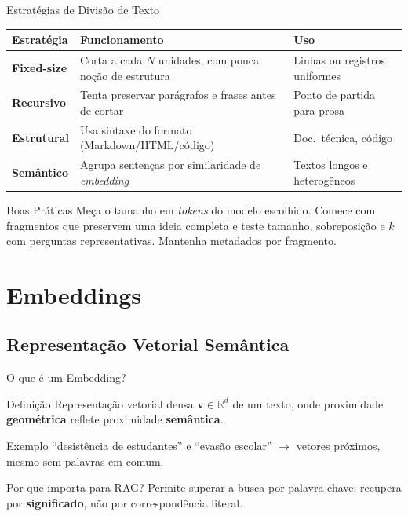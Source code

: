 \documentclass[aspectratio=169]{beamer}
\begin{document}
\begin{frame}[shrink=5]{Estratégias de Divisão de Texto}
    \begin{center}\footnotesize
    \begin{tabular}{>{\bfseries}p{2.6cm}p{5.8cm}p{2.6cm}}
    \toprule
    Estratégia & Funcionamento & Uso \\
    \midrule
    Fixed-size & Corta a cada $N$ unidades, com pouca noção de estrutura & Linhas ou registros uniformes \\
    Recursivo & Tenta preservar parágrafos e frases antes de cortar & Ponto de partida para prosa \\
    Estrutural & Usa sintaxe do formato (Markdown/HTML/código) & Doc.\ técnica, código \\
    Semântico & Agrupa sentenças por similaridade de \textit{embedding} & Textos longos e heterogêneos \\
    \bottomrule
    \end{tabular}
    \end{center}
    \pause
    \begin{alertblock}{Boas Práticas}
        \footnotesize Meça o tamanho em \textit{tokens} do modelo escolhido. Comece com fragmentos que preservem uma ideia completa e teste tamanho, sobreposição e $k$ com perguntas representativas. Mantenha metadados por fragmento.
    \end{alertblock}
\end{frame}

\section{Embeddings}

\subsection{Representação Vetorial Semântica}

\begin{frame}{O que é um Embedding?}
    \begin{block}{Definição}
        \footnotesize Representação vetorial densa $\mathbf{v} \in \mathbb{R}^d$ de um texto, onde proximidade \textbf{geométrica} reflete proximidade \textbf{semântica}.
    \end{block}
    \pause
    \begin{exampleblock}{Exemplo}
        \footnotesize ``desistência de estudantes'' e ``evasão escolar'' $\to$ vetores próximos, mesmo sem palavras em comum.
    \end{exampleblock}
    \pause
    \begin{alertblock}{Por que importa para RAG?}
        \footnotesize Permite superar a busca por palavra-chave: recupera por \textbf{significado}, não por correspondência literal.
    \end{alertblock}
\end{frame}
\end{document}
